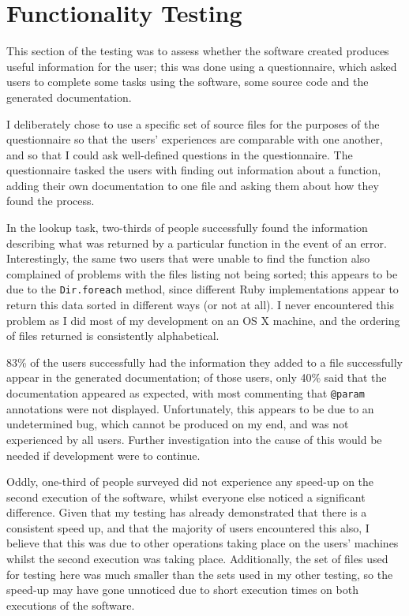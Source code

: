\section{Functionality Testing}
This section of the testing was to assess whether the software created
produces useful information for the user; this was done using a questionnaire,
which asked users to complete some tasks using the software, some source code
and the generated documentation.

I deliberately chose to use a specific set of source files for the purposes of
the questionnaire so that the users' experiences are comparable with one
another, and so that I could ask well-defined questions in the questionnaire.
The questionnaire tasked the users with finding out information about a
function, adding their own documentation to one file and asking them about how
they found the process.

In the lookup task, two-thirds of people successfully found the information
describing what was returned by a particular function in the event of an
error. Interestingly, the same two users that were unable to find the function
also complained of problems with the files listing not being sorted; this
appears to be due to the \lstinline|Dir.foreach| method, since different Ruby
implementations appear to return this data sorted in different ways (or not at
all). I never encountered this problem as I did most of my development on an OS
X machine, and the ordering of files returned is consistently alphabetical.

83\% of the users successfully had the information they added to a file
successfully appear in the generated documentation; of those users, only 40\%
said that the documentation appeared as expected, with most commenting that
\lstinline|@param| annotations were not displayed. Unfortunately, this appears
to be due to an undetermined bug, which cannot be produced on my end, and was
not experienced by all users. Further investigation into the cause of this
would be needed if development were to continue.

Oddly, one-third of people surveyed did not experience any speed-up on the
second execution of the software, whilst everyone else noticed a significant
difference. Given that my testing has already demonstrated that there is a
consistent speed up, and that the majority of users encountered this also, I
believe that this was due to other operations taking place on the users'
machines whilst the second execution was taking place. Additionally, the
set of files used for testing here was much smaller than the sets used in my
other testing, so the speed-up may have gone unnoticed due to short execution
times on both executions of the software.

